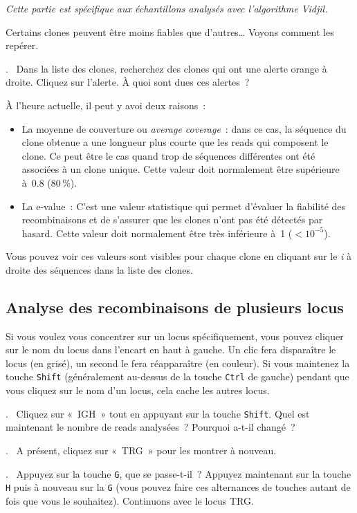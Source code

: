 \documentclass[11pt]{article}
\newcounter{questionum}
\newcommand\com[1]{\textsf{«~#1~»}}
\newcommand\question[1]{\par\noindent\textbf{\thequestionum}.~#1\addtocounter{questionum}{1}}
\begin{document}
\bigskip

\textit{Cette partie est spécifique aux échantillons analysés avec
l'algorithme Vidjil.}

Certains clones peuvent être moins fiables que d'autres\ldots{} Voyons
comment les repérer.
\question{%
  Dans la liste des clones, recherchez des clones qui ont une
  alerte orange à droite. Cliquez sur l'alerte. À quoi sont dues ces
  alertes~?}

À l'heure actuelle, il peut y avoi deux raisons~:
\begin{itemize}
\item
  La moyenne de couverture ou \textit{average coverage}~: dans ce cas, la
  séquence du clone obtenue a une longueur plus courte que les reads qui
  composent le clone. Ce peut être le cas quand trop de séquences
  différentes ont été associées à un clone unique. Cette valeur doit
  normalement être supérieure à~0.8 (80\,\%).
\item
  La e-value~: C'est une valeur statistique qui permet d'évaluer la
  fiabilité des recombinaisons et de s'assurer que les clones n'ont pas été détectés
  par hasard. Cette valeur doit normalement être très
  inférieure à~1 ($<10^{-5}$).
\end{itemize}

Vous pouvez voir ces valeurs sont visibles pour chaque clone en cliquant
sur le \textit{i} à droite des séquences dans la liste des clones.

\subsection{Analyse des recombinaisons de plusieurs locus}

Si vous voulez vous concentrer sur un locus spécifiquement, vous pouvez
cliquer sur le nom du locus dans l'encart en haut à gauche. Un clic fera
disparaître le locus (en grisé), un second le fera réapparaître (en
couleur). Si vous maintenez la touche \texttt{Shift} (généralement au-dessus de
la touche \texttt{Ctrl} de gauche) pendant que vous cliquez sur le nom d'un
locus, cela cache les autres locus.

\question{%
  Cliquez sur \com{IGH} tout en appuyant sur la touche \texttt{Shift}. Quel est
  maintenant le nombre de reads analysées~? Pourquoi a-t-il changé~?}
\question{%
  A présent, cliquez sur \com{TRG} pour les montrer à nouveau.}
\question{%
  Appuyez sur la touche \texttt{G}, que se passe-t-il~? Appuyez maintenant sur la
  touche \texttt{H} puis à nouveau sur la \texttt{G} (vous pouvez faire ces alternances de
  touches autant de fois que vous le souhaitez). Continuons avec le
  locus TRG.}
\end{document}
